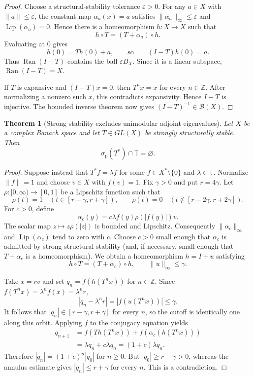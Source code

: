 \documentclass[11pt]{article}
\newtheorem{theorem}{Theorem}
\newcommand{\Torus}{\mathbb T}
\newcommand{\Lip}{\operatorname{Lip}}
\newcommand{\ran}{\operatorname{Ran}}
\newcommand{\spa}{\sigma_{\mathrm p}}
\begin{document}
\begin{proof}
Choose a structural-stability tolerance $\varepsilon>0$. For any $a\in X$ with
$\|a\|\leq\varepsilon$, the constant map $\alpha_a(x)=a$ satisfies
$\|\alpha_a\|_\infty\leq\varepsilon$ and $\Lip(\alpha_a)=0$. Hence there is a
homeomorphism $h:X\to X$ such that
\[
 h\circ T=(T+\alpha_a)\circ h.
\]
Evaluating at $0$ gives
\[
 h(0)=Th(0)+a,
 \qquad\text{so}\qquad
 (I-T)h(0)=a.
\]
Thus $\ran(I-T)$ contains the ball $\varepsilon B_X$. Since it is a linear subspace,
$\ran(I-T)=X$.

If $T$ is expansive and $(I-T)x=0$, then $T^nx=x$ for every $n\in\mathbb Z$.
After normalizing a nonzero such $x$, this contradicts expansivity. Hence $I-T$ is
injective. The bounded inverse theorem now gives $(I-T)^{-1}\in\mathcal B(X)$.
\end{proof}

\begin{theorem}[Strong stability excludes unimodular adjoint eigenvalues]\label{thm:adjoint}
Let $X$ be a complex Banach space and let $T\in GL(X)$ be strongly structurally
stable. Then
\[
 \spa(T^*)\cap\Torus=\varnothing.
\]
\end{theorem}

\begin{proof}
Suppose instead that $T^*f=\lambda f$ for some $f\in X^*\setminus\{0\}$ and
$\lambda\in\Torus$. Normalize $\|f\|=1$ and choose $v\in X$ with $f(v)=1$.
Fix $\gamma>0$ and put $r=4\gamma$. Let $\rho:[0,\infty)\to[0,1]$ be a Lipschitz
function such that
\[
 \rho(t)=1\quad(t\in[r-\gamma,r+\gamma]),
 \qquad
 \rho(t)=0\quad(t\notin[r-2\gamma,r+2\gamma]).
\]
For $c>0$, define
\[
 \alpha_c(y)=c\lambda f(y)\rho(|f(y)|)v.
\]
The scalar map $z\mapsto z\rho(|z|)$ is bounded and Lipschitz. Consequently
$\|\alpha_c\|_\infty$ and $\Lip(\alpha_c)$ tend to zero with $c$. Choose $c>0$
small enough that $\alpha_c$ is admitted by strong structural stability (and, if
necessary, small enough that $T+\alpha_c$ is a homeomorphism). We obtain a
homeomorphism $h=I+u$ satisfying
\[
 h\circ T=(T+\alpha_c)\circ h,
 \qquad \|u\|_\infty\leq\gamma.
\]

Take $x=rv$ and set $q_n=f(h(T^nx))$ for $n\in\mathbb Z$. Since
$f(T^nx)=\lambda^n f(x)=\lambda^n r$,
\[
 |q_n-\lambda^nr|=|f(u(T^nx))|\leq\gamma.
\]
It follows that $|q_n|\in[r-\gamma,r+\gamma]$ for every $n$, so the cutoff is
identically one along this orbit. Applying $f$ to the conjugacy equation yields
\begin{align*}
 q_{n+1}
 &=f(Th(T^nx))+f(\alpha_c(h(T^nx)))\\
 &=\lambda q_n+c\lambda q_n
  =(1+c)\lambda q_n.
\end{align*}
Therefore $|q_n|=(1+c)^n|q_0|$ for $n\geq0$. But $|q_0|\geq r-\gamma>0$,
whereas the annulus estimate gives $|q_n|\leq r+\gamma$ for every $n$. This is a
contradiction.
\end{proof}
\end{document}
